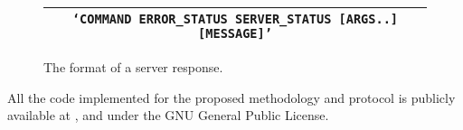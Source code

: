 \begin{figure}[htpb]
    \centering
    \footnotesize
    \begin{tabular}{@{}c@{}}
        \toprule
        {\tt \lq{}COMMAND ERROR\_STATUS SERVER\_STATUS [ARGS..] [MESSAGE]\rq{}} \\ \bottomrule
    \end{tabular}
    \caption{The format of a server response.}
    \label{fig:response-template}
\end{figure}

All the code implemented for the proposed methodology and protocol is publicly
available at , 
 and 
 under the GNU General Public License.
